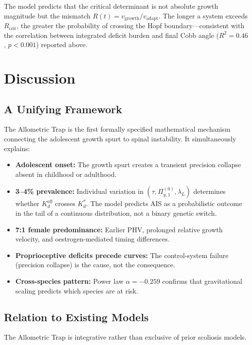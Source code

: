 \documentclass[12pt, letterpaper]{article}
\newcommand{\Kdcrit}{K_d^{*}}
\newcommand{\Kdeff}{K_d^{\mathrm{eff}}}
\newcommand{\Piy}{\Pi_{y,1}}
\newcommand{\Rt}{R(t)}
\begin{document}
The model predicts that the critical determinant is not absolute growth magnitude
but the mismatch $\Rt = v_{\mathrm{growth}}/v_{\mathrm{adapt}}$. The longer a
system exceeds $R_{\mathrm{crit}}$, the greater the probability of crossing the
Hopf boundary---consistent with the correlation between integrated deficit burden
and final Cobb angle ($R^{2} = 0.46$, $p < 0.001$) reported above.

\section{Discussion}

\subsection{A Unifying Framework}

The Allometric Trap is the first formally specified mathematical mechanism
connecting the adolescent growth spurt to spinal instability. It simultaneously
explains:

\begin{itemize}
  \item \textbf{Adolescent onset:} The growth spurt creates a transient precision
    collapse absent in childhood or adulthood.
  \item \textbf{3--4\% prevalence:} Individual variation in
    $(\tau, \Piy^{(0)}, \lambda_L)$ determines whether $\Kdeff$ crosses
    $\Kdcrit$. The model predicts AIS as a probabilistic outcome in the tail of
    a continuous distribution, not a binary genetic switch.
  \item \textbf{7:1 female predominance:} Earlier PHV, prolonged relative growth
    velocity, and oestrogen-mediated timing differences.
  \item \textbf{Proprioceptive deficits precede curves:} The control-system
    failure (precision collapse) is the cause, not the consequence.
  \item \textbf{Cross-species pattern:} Power law $\alpha = -0.259$ confirms that
    gravitational scaling predicts which species are at risk.
\end{itemize}

\subsection{Relation to Existing Models}

The Allometric Trap is integrative rather than exclusive of prior scoliosis models.
\end{document}
